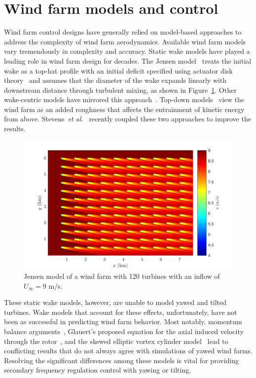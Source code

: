 \section{Wind farm models and control}
\label{sec:intro-models}
Wind farm control designs have generally relied on model-based approaches to address the complexity of wind farm aerodynamics. Available wind farm models vary tremendously in complexity and accuracy. Static wake models have played a leading role in wind farm design for decades. The Jensen model~\cite{Jensen1983a, Katic1986a} treats the initial wake as a top-hat profile with an initial deficit specified using actuator disk theory~\cite{Burton2011a} and assumes that the diameter of the wake expands linearly with downstream distance through turbulent mixing, as shown in Figure~\ref{fig:jensen}. Other wake-centric models have mirrored this approach~\cite{Ainslie1988a, Bastankhah2014a, Niayifar2015a, Niayifar2016a, Archer2018a, Frandsen2006a, Gebraad2014c}. Top-down models~\cite{Frandsen1992a, Frandsen2006a, Calaf2010a, Meneveau2012a} view the wind farm as an added roughness that affects the entrainment of kinetic energy from above. Stevens~\textit{et al.}~\cite{Stevens2015a, Stevens2016c} recently coupled these two approaches to improve the results.

\begin{figure}[h]
\includegraphics[width=\textwidth]{./fig/jensen.png}
\caption{Jensen model of a wind farm with 120 turbines with an inflow of $U_\infty = 9$ m/s.}
\label{fig:jensen}
\end{figure}

These static wake models, however, are unable to model yawed and tilted turbines. Wake models that account for these effects, unfortunately, have not been as successful in predicting wind farm behavior. Most notably, momentum balance arguments~\cite{Burton2011a, Jimenez2010a}, Glauert's proposed equation for the axial induced velocity through the rotor~\cite{Glauert1926a}, and the skewed elliptic vortex cylinder model~\cite{Coleman1945a, Branlard2016a} lead to conflicting results that do not always agree with simulations of yawed wind farms. Resolving the significant differences among these models is vital for providing secondary frequency regulation control with yawing or tilting.

